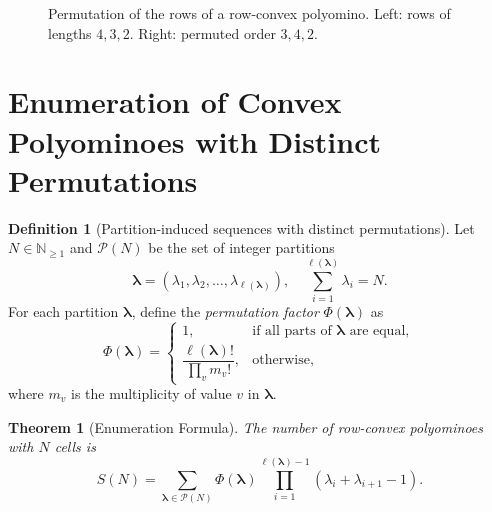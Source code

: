 \documentclass{article}
\theoremstyle{definition}
\newtheorem{definition}{Definition}[section]
\theoremstyle{plain}
\newtheorem{theorem}{Theorem}[section]
\begin{document}
\begin{figure}[H]
\centering
{}
\caption{Permutation of the rows of a row-convex polyomino. Left: rows of 
lengths $4,3,2$. Right: permuted order $3,4,2$.}
\label{fig:polyomino_row_permutation}
\end{figure}

\section{Enumeration of Convex Polyominoes with Distinct Permutations}

\begin{definition}[Partition-induced sequences with distinct permutations]
Let $N \in \mathbb{N}_{\ge 1}$ and $\mathcal{P}(N)$ be the set of integer 
partitions
\[
\boldsymbol{\lambda} = (\lambda_1, \lambda_2, \dots, 
\lambda_{\ell(\boldsymbol{\lambda})}), \quad 
\sum_{i=1}^{\ell(\boldsymbol{\lambda})} \lambda_i = N.
\]
For each partition $\boldsymbol{\lambda}$, define the 
\emph{permutation factor} $\Phi(\boldsymbol{\lambda})$ as
\[
\Phi(\boldsymbol{\lambda}) =
\begin{cases}
1, & \text{if all parts of } \boldsymbol{\lambda} \text{ are equal},\\[1mm]
\dfrac{\ell(\boldsymbol{\lambda})!}{\prod_v m_v!}, & \text{otherwise,}
\end{cases}
\]
where $m_v$ is the multiplicity of value $v$ in $\boldsymbol{\lambda}$.
\end{definition}

\begin{theorem}[Enumeration Formula]
\label{teo:teorema}
The number of row-convex polyominoes with $N$ cells is
\[
S(N) = \sum_{\boldsymbol{\lambda} \in \mathcal{P}(N)} 
\Phi(\boldsymbol{\lambda}) \prod_{i=1}^{\ell(\boldsymbol{\lambda})-1} 
(\lambda_i + \lambda_{i+1} - 1).
\]
\end{theorem}
\end{document}
